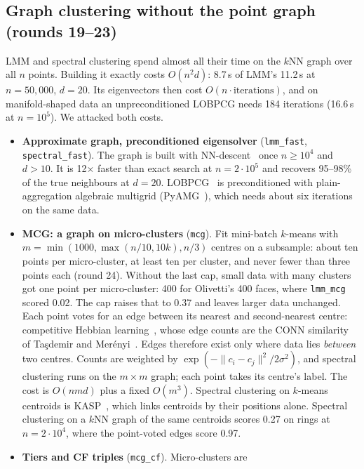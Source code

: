 \documentclass[11pt,a4paper]{article}
\newcommand{\code}[1]{\texttt{#1}}
\begin{document}
\subsection{Graph clustering without the point graph (rounds 19--23)}\label{sec:mcg}
LMM and spectral clustering spend almost all their time on the $k$NN graph
over all $n$ points. Building it exactly costs $O(n^2 d)$: 8.7\,s of LMM's
11.2\,s at $n = 50{,}000$, $d = 20$. Its eigenvectors then cost
$O(n \cdot \text{iterations})$, and on manifold-shaped data an
unpreconditioned LOBPCG needs 184 iterations (16.6\,s at $n = 10^5$). We
attacked both costs.
\begin{itemize}
  \item \textbf{Approximate graph, preconditioned eigensolver}
  (\code{lmm\_fast}, \code{spectral\_fast}). The graph is built with
  NN-descent~\cite{dong2011efficient} once $n \ge 10^4$ and $d > 10$. It is
  12$\times$ faster than exact search at $n = 2\cdot10^5$ and recovers 95--98\%
  of the true neighbours at $d = 20$. LOBPCG~\cite{knyazev2001toward} is
  preconditioned with plain-aggregation algebraic multigrid
  (PyAMG~\cite{bell2022pyamg}), which needs about six iterations on the same
  data.
  \item \textbf{MCG: a graph on micro-clusters} (\code{mcg}). Fit mini-batch
  $k$-means with $m = \min(1000, \max(n/10, 10k), n/3)$ centres on a
  subsample: about ten points per micro-cluster, at least ten per cluster,
  and never fewer than three points each (round 24).
  Without the last cap, small data with many clusters got one point per
  micro-cluster: 400 for Olivetti's 400 faces, where \code{lmm\_mcg} scored
  0.02. The cap raises that to 0.37 and leaves larger data unchanged. Each point
  votes for an edge between its nearest and second-nearest centre:
  competitive Hebbian learning~\cite{martinetz1994topology}, whose edge counts
  are the CONN similarity of Ta\c{s}demir and Mer\'enyi~\cite{tasdemir2009exploiting}.
  Edges therefore exist only where data lies \emph{between} two centres.
  Counts are weighted by $\exp(-\|c_i-c_j\|^2/2\sigma^2)$, and spectral
  clustering runs on the $m \times m$ graph; each point takes its centre's
  label. The cost is $O(nmd)$ plus a fixed $O(m^3)$. Spectral clustering on
  $k$-means centroids is KASP~\cite{yan2009fast}, which links centroids by
  their positions alone. Spectral clustering on a $k$NN graph of the same
  centroids scores 0.27 on rings at $n = 2\cdot10^4$, where the point-voted
  edges score 0.97.
  \item \textbf{Tiers and CF triples} (\code{mcg\_cf}). Micro-clusters are

\end{itemize}
\end{document}
